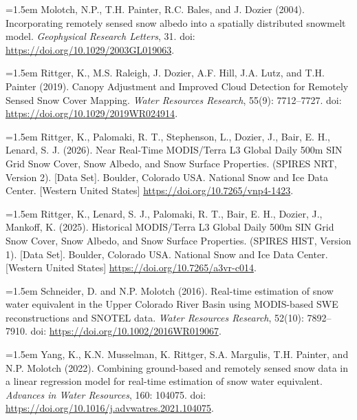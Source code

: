 \documentclass{article}
\begin{document}
\noindent
\hangindent=1.5em
Molotch, N.P., T.H. Painter, R.C. Bales, and J. Dozier (2004). Incorporating remotely sensed snow albedo into a spatially distributed snowmelt model. \textit{Geophysical Research Letters}, 31. doi: \url{https://doi.org/10.1029/2003GL019063}.

\noindent
\hangindent=1.5em
Rittger, K., M.S. Raleigh, J. Dozier, A.F. Hill, J.A. Lutz, and T.H. Painter (2019). Canopy Adjustment and Improved Cloud Detection for Remotely Sensed Snow Cover Mapping. \textit{Water Resources Research}, 55(9): 7712–7727. doi: \url{https://doi.org/10.1029/2019WR024914}.

\noindent
\hangindent=1.5em
Rittger, K., Palomaki, R. T., Stephenson, L., Dozier, J., Bair, E. H., Lenard, S. J. (2026). Near Real-Time MODIS/Terra L3 Global Daily 500m SIN Grid Snow Cover, Snow Albedo, and Snow Surface Properties. (SPIRES NRT, Version 2). [Data Set]. Boulder, Colorado USA. National Snow and Ice Data Center. [Western United States] \url{https://doi.org/10.7265/vnp4-1423}.

\noindent
\hangindent=1.5em
Rittger, K., Lenard, S. J., Palomaki, R. T., Bair, E. H., Dozier, J., Mankoff, K. (2025). Historical MODIS/Terra L3 Global Daily 500m SIN Grid Snow Cover, Snow Albedo, and Snow Surface Properties. (SPIRES HIST, Version 1). [Data Set]. Boulder, Colorado USA. National Snow and Ice Data Center. [Western United States] \url{https://doi.org/10.7265/a3vr-c014}.

\noindent
\hangindent=1.5em
Schneider, D. and N.P. Molotch (2016). Real-time estimation of snow water equivalent in the Upper Colorado River Basin using MODIS-based SWE reconstructions and SNOTEL data. \textit{Water Resources Research}, 52(10): 7892–7910. doi: \url{https://doi.org/10.1002/2016WR019067}.

\noindent
\hangindent=1.5em
Yang, K., K.N. Musselman, K. Rittger, S.A. Margulis, T.H. Painter, and N.P. Molotch (2022). Combining ground-based and remotely sensed snow data in a linear regression model for real-time estimation of snow water equivalent. \textit{Advances in Water Resources}, 160: 104075. doi: \url{https://doi.org/10.1016/j.advwatres.2021.104075}.
\end{document}
